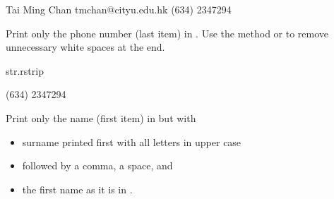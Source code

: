 \documentclass[letterpaper,10pt,english]{sphinxmanual}
\begin{document}
\begin{sphinxVerbatim}[commandchars=\\\{\}]
\end{sphinxVerbatim}

\begin{sphinxVerbatim}[commandchars=\\\{\}]
Tai Ming Chan
tmchan@cityu.edu.hk
(634) 234\PYGZhy{}7294
\end{sphinxVerbatim}

 Print only the phone number (last item) in . Use the method  or   to remove unnecessary white spaces at the end.

\begin{sphinxVerbatim}[commandchars=\\\{\}]
str.rstrip
\PYG{p}{[}\PYG{p}{]}
\end{sphinxVerbatim}

\begin{sphinxVerbatim}[commandchars=\\\{\}]
(634) 234\PYGZhy{}7294
\end{sphinxVerbatim}

 Print only the name (first item) in  but with
\begin{itemize}
\item {} 
surname printed first with all letters in upper case

\item {} 
followed by a comma, a space, and

\item {} 
the first name as it is in .

\end{itemize}
\end{document}
